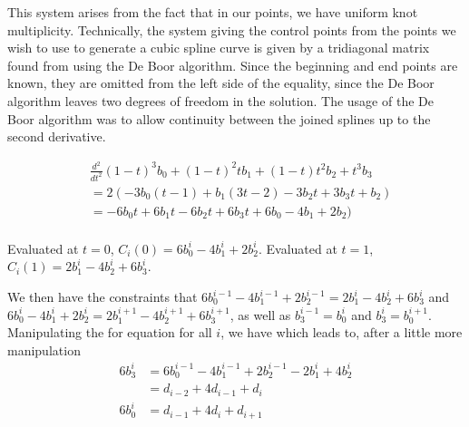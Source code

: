 \documentclass[12pt]{article}
\begin{document}
This system arises from the fact that in our points, we have uniform knot multiplicity. 
Technically, the system giving the control points from the points we wish to use to 
generate a cubic spline curve is given by a tridiagonal matrix found from using the 
De Boor algorithm. Since the beginning and end points are known, they are omitted from 
the left side of the equality, since the De Boor algorithm leaves two degrees of freedom in the solution.
The usage of the De Boor algorithm was to allow continuity between the joined splines up to the second derivative.

\begin{align*}
&\frac{d^2}{dt^2} (1-t)^3 b_0 + (1-t)^2 t b_1 + (1-t)t^2 b_2 + t^3 b_3\\
&= 2(-3 b_0(t-1) + b_1(3t - 2) - 3 b_2 t + 3 b_3 t + b_2)\\
&= -6 b_0 t + 6 b_1 t - 6 b_2 t + 6 b_3 t + 6 b_0 - 4 b_1 + 2 b_2)\\
\end{align*}

Evaluated at $t=0$,
$C_i(0) = 6 b_0^i - 4 b_1^i + 2 b_2^i$.
Evaluated at $t=1$,
$C_i(1) = 2 b_1^i - 4 b_2^i + 6 b_3^i$.

We then have the constraints that 
$6 b_0^{i-1} - 4 b_1^{i-1} + 2 b_2^{i-1} = 2 b_1^i - 4 b_2^i + 6 b_3^i$ and
$6 b_0^{i} - 4 b_1^{i} + 2 b_2^{i} = 2 b_1^{i+1} - 4 b_2^{i+1} + 6 b_3^{i+1}$,
as well as $b_3^{i-1} = b_0^i$ and $b_3^i = b_0^{i+1}$.
Manipulating the for equation for all $i$, we have 
which leads to, after a little more manipulation
\begin{align*}
6b_3^i &= 6 b_0 ^{i-1} - 4 b_1^{i-1} + 2b_2^{i-1}-2b_1^{i}+4b_2^i\\
&= d_{i-2} + 4 d_{i-1} + d_{i}\\
6b_0^i &= d_{i-1} + 4 d_{i} + d_{i+1}
\end{align*}
\end{document}
